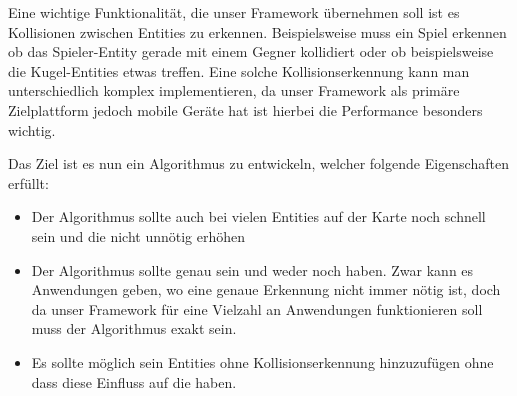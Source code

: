 








Eine wichtige Funktionalität, die unser Framework übernehmen soll ist es Kollisionen zwischen Entities zu erkennen. Beispielsweise muss ein Spiel erkennen ob das Spieler-Entity gerade mit einem Gegner kollidiert oder ob beispielsweise die Kugel-Entities etwas treffen. Eine solche Kollisionserkennung kann man unterschiedlich komplex implementieren, da unser Framework als primäre Zielplattform jedoch mobile Geräte hat ist hierbei die Performance besonders wichtig.

Das Ziel ist es nun ein Algorithmus zu entwickeln, welcher folgende Eigenschaften erfüllt:

\begin{itemize}
\item Der Algorithmus sollte auch bei vielen Entities auf der Karte noch schnell sein und die  nicht unnötig erhöhen
\item Der Algorithmus sollte genau sein und weder  noch  haben. Zwar kann es Anwendungen geben, wo eine genaue Erkennung nicht immer nötig ist, doch da unser Framework für eine Vielzahl an Anwendungen funktionieren soll muss der Algorithmus exakt sein.
\item Es sollte möglich sein Entities ohne Kollisionserkennung hinzuzufügen ohne dass diese Einfluss auf die  haben.
\end{itemize}

